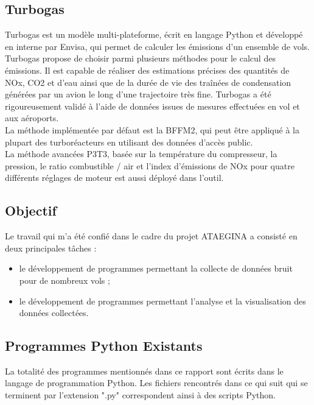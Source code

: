 \documentclass[a4paper,12pt,twoside]{article}
\begin{document}
    \subsection{Turbogas}
    \gls{Turbogas} est un modèle multi-plateforme, écrit en langage Python et développé en interne par Envisa, qui permet de calculer les émissions d'un ensemble de vols. \gls{Turbogas} propose de choisir parmi plusieurs méthodes pour le calcul des émissions.
    Il est capable de réaliser des estimations précises des quantités de \gls{NOx}, \gls{CO2} et d'eau ainsi que de la durée de vie des traînées de condensation générées par un avion le long d'une trajectoire très fine. \gls{Turbogas} a été rigoureusement validé à l'aide de données issues de mesures effectuées en vol et aux aéroports.\\
    La méthode implémentée par défaut est la \gls{BFFM2}, qui peut être appliqué à la plupart des turboréacteurs en utilisant des données d'accès public.\\
    La méthode avancées \gls{P3T3}, basée sur la température du compresseur, la pression, le ratio combustible / air et l'index d'émissions de \gls{NOx} pour quatre différents réglages de moteur est aussi déployé dans l'outil.
    
    \subsection{Objectif}
    Le travail qui m'a été confié dans le cadre du projet ATAEGINA a consisté en deux principales tâches :
    \begin{itemize}
        \item le développement de programmes permettant la collecte de données bruit pour de nombreux vols ;
        \item le développement de programmes permettant l'analyse et la visualisation des données collectées.
    \end{itemize}
    
    \subsection{Programmes Python Existants}
    La totalité des programmes mentionnés dans ce rapport sont écrits dans le langage de programmation Python. Les fichiers rencontrés dans ce qui suit qui se terminent par l'extension ".py" correspondent ainsi à des scripts Python.
\end{document}
